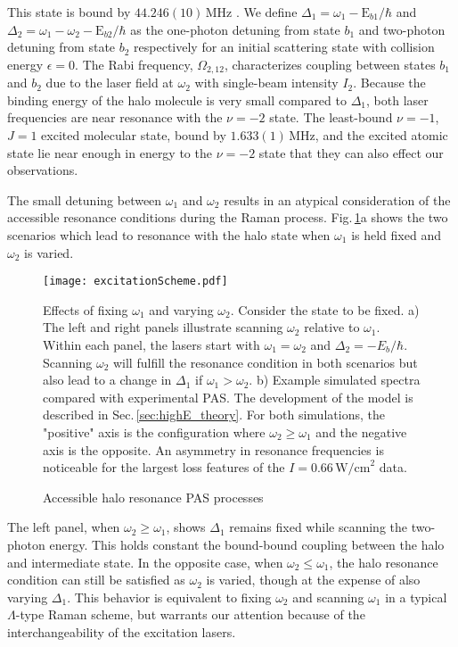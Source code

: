 This state is bound by $44.246(10)$\,MHz \cite{Borkowski2014a, Reschovsky2018}.
We define $\Delta_1=\omega_1-\text{E}_{b1}/\hbar$ and $\Delta_2=\omega_1-\omega_2-\text{E}_{b2}/\hbar$ as the one-photon detuning from state $b_1$ and two-photon detuning from state $b_2$ respectively for an initial scattering state with collision energy $\epsilon=0$.
The Rabi frequency, $\Omega_{2,12}$, characterizes coupling between states $b_1$ and $b_2$ due to the laser field at $\omega_2$ with single-beam intensity $I_2$.
Because the binding energy of the halo molecule is very small compared to $\Delta_1$, both laser frequencies are near resonance with the $\nu=-2$ state. 
The least-bound $\nu=-1$, $J=1$ excited molecular state, bound by $1.633(1)$\,MHz, and the excited atomic state lie near enough in energy to the $\nu = -2$ state that they can also effect our observations.	

The small detuning between $\omega_1$ and $\omega_2$ results in an atypical consideration of the accessible resonance conditions during the Raman process.
Fig.\,\ref{fig:haloResProcess}a shows the two scenarios which lead to resonance with the halo state when $\omega_1$ is held fixed and $\omega_2$ is varied.
	\begin{figure}
	\hspace*{-0.05\textwidth}  
	\centerline{
	  \texttt{[image: excitationScheme.pdf]}}
	  \caption{Accessible halo resonance PAS processes}{Effects of fixing $\omega_1$ and varying $\omega_2$. Consider the state  to be fixed. a) The left and right panels illustrate scanning $\omega_2$ relative to $\omega_1$. Within each panel, the lasers start with $\omega_1 = \omega_2$ and $\Delta_2 = -E_b/\hbar$. Scanning $\omega_2$ will fulfill the resonance condition in both scenarios but also lead to a change in $\Delta_1$ if $\omega_1 > \omega_2$.  b) Example simulated spectra compared with experimental PAS. The development of the model is described in Sec.\,\ref{sec:highE_theory}. For both simulations, the "positive" axis is the configuration where $\omega_2 \geq \omega_1$ and the negative axis is the opposite. An asymmetry in resonance frequencies is noticeable for the largest loss features of the $I=0.66\,\text{W/cm}^2$ data.}
	  \label{fig:haloResProcess}
	\end{figure}
The left panel, when $\omega_2 \geq \omega_1$, shows $\Delta_1$ remains fixed while scanning the two-photon energy.
This holds constant the bound-bound coupling between the halo and intermediate state.
In the opposite case, when $\omega_2 \leq \omega_1$, the halo resonance condition can still be satisfied as $\omega_2$ is varied, though at the expense of also varying $\Delta_1$.
This behavior is equivalent to fixing $\omega_2$ and scanning $\omega_1$ in a typical $\Lambda$-type Raman scheme, but warrants our attention because of the interchangeability of the excitation lasers.

